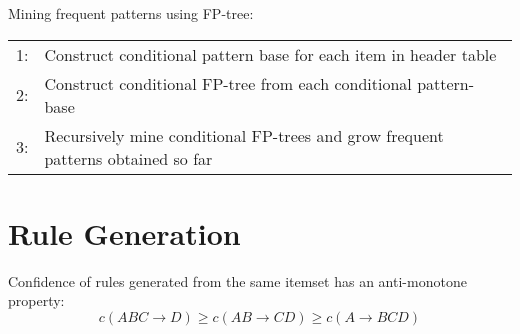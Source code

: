 \noindent Mining frequent patterns using FP-tree:
\begin{table}[h!]
\begin{tabular}{r p{12cm}}
\hline
    1: & Construct conditional pattern base for each item in header table\\
    2: & Construct conditional FP-tree from each conditional pattern-base\\
    3: & Recursively mine conditional FP-trees and grow frequent patterns obtained so far\\
\hline
\end{tabular}
\end{table}

\section{Rule Generation}
Confidence of rules generated from the same itemset has an anti-monotone property:
$$c(ABC \rightarrow D) \ge c(AB \rightarrow CD) \ge c(A \rightarrow BCD)$$




